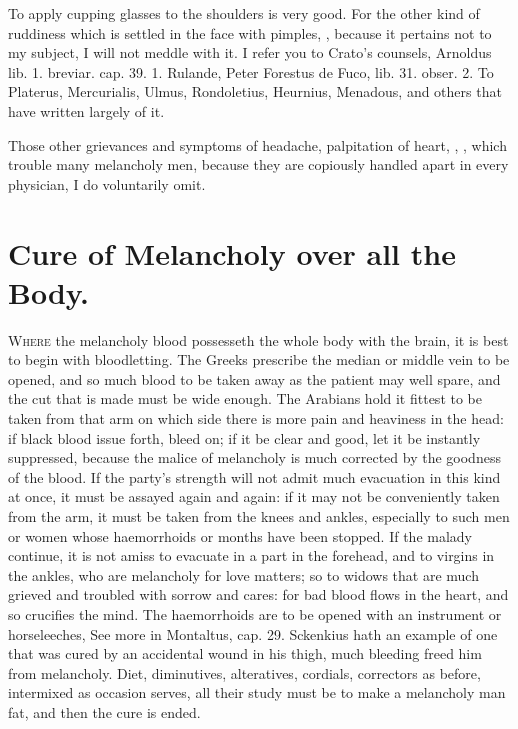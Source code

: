To apply cupping glasses to the shoulders is very good. For the
other kind of ruddiness which is settled in the face with pimples, \etc{},
because it pertains not to my subject, I will not meddle with it. I
refer you to Crato's counsels, Arnoldus lib. 1. breviar. cap. 39. 1.
Rulande, Peter Forestus de Fuco, lib. 31. obser. 2. To Platerus,
Mercurialis, Ulmus, Rondoletius, Heurnius, Menadous, and others that
have written largely of it.

Those other grievances and symptoms of headache, palpitation of heart,
, \etc{}, which trouble many melancholy men, because they
are copiously handled apart in every physician, I do voluntarily omit.


\section{Cure of Melancholy over all the Body.}

\lettrine{W}{here} the melancholy blood possesseth the whole body with the brain,
 it is best to begin with bloodletting. The Greeks prescribe the
 median or middle vein to be opened, and so much blood to be
taken away as the patient may well spare, and the cut that is made must
be wide enough. The Arabians hold it fittest to be taken from that arm
on which side there is more pain and heaviness in the head: if black
blood issue forth, bleed on; if it be clear and good, let it be
instantly suppressed,  because the malice of melancholy is much
corrected by the goodness of the blood. If the party's strength will
not admit much evacuation in this kind at once, it must be assayed
again and again: if it may not be conveniently taken from the arm, it
must be taken from the knees and ankles, especially to such men or
women whose haemorrhoids or months have been stopped.  If the
malady continue, it is not amiss to evacuate in a part in the forehead,
and to virgins in the ankles, who are melancholy for love matters; so
to widows that are much grieved and troubled with sorrow and cares: for
bad blood flows in the heart, and so crucifies the mind. The
haemorrhoids are to be opened with an instrument or horseleeches, \etc{}
See more in Montaltus, cap. 29. Sckenkius hath an example of one
that was cured by an accidental wound in his thigh, much bleeding freed
him from melancholy. Diet, diminutives, alteratives, cordials,
correctors as before, intermixed as occasion serves, all their
study must be to make a melancholy man fat, and then the cure is ended.

